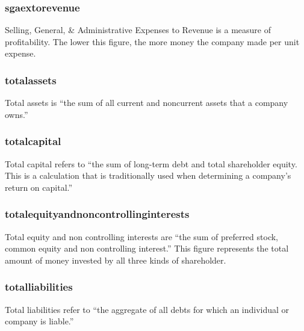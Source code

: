 \subsubsection*{sgaextorevenue}
Selling, General, \& Administrative Expenses to Revenue is a measure of profitability. The lower this figure, the more money the company made per unit expense. \cite{sgaextorevenue}

\subsubsection*{totalassets}
Total assets is ``the sum of all current and noncurrent assets that a company owns.''\cite{intrinioDataTags}

\subsubsection*{totalcapital}
Total capital refers to ``the sum of long-term debt and total shareholder equity. This is a calculation that is traditionally used when determining a company's return on capital.''\cite{intrinioDataTags}

\subsubsection*{totalequityandnoncontrollinginterests}
Total equity and non controlling interests are ``the sum of preferred stock, common equity and non controlling interest.''\cite{intrinioDataTags} This figure represents the total amount of money invested by all three kinds of shareholder.

\subsubsection*{totalliabilities}
Total liabilities refer to ``the aggregate of all debts for which an individual or company is liable.'' \cite{totalLiabilities}

